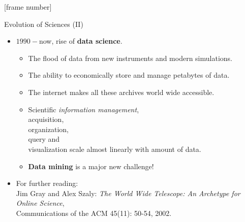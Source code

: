 \documentclass[aspectratio=169,t]{beamer}
\begin{document}
  {
    [frame number]
    \begin{frame}{Evolution of Sciences (II)}
        \begin{itemize}
            \item $1990-$now, rise of \textbf{data science}.
                  \begin{itemize}
                      \item The flood of data from new instruments and modern simulations.
                      \item The ability to economically store and manage petabytes of data.
                      \item The internet makes all these archives world wide accessible.
                      \item Scientific \emph{information management}, \\
                            acquisition,\\
                            organization, \\
                            query and \\
                            visualization scale almost linearly with amount of data.
                      \item \textbf{Data mining} is a major new challenge!
                  \end{itemize}
          \item For further reading:\\
                \small{Jim Gray and Alex Szaly: \emph{The World Wide Telescope: An Archetype for Online Science}, \\ Communications of the ACM 45(11): 50-54, 2002.}
        \end{itemize}
    \end{frame}
  }
\end{document}

